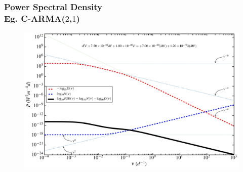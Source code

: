 \documentclass[hyperref={pdfpagelabels=false}]{beamer}
\begin{document}
\begin{frame}
\frametitle{Power Spectral Density\\Eg. C-ARMA($2$,$1$)}
      \begin{figure}
        \includegraphics[scale=0.0775]{images/CARMA(2,1)_PSD.jpg}
      \end{figure}
\end{frame}
\end{document}
